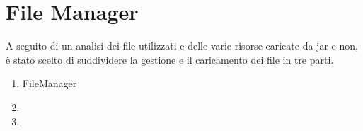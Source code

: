 \section{File Manager}
\label{sec:file_manager_design}
A seguito di un analisi dei file utilizzati e delle varie risorse caricate da jar e non, è stato scelto di suddividere la gestione e il caricamento dei file in tre parti.

\begin{enumerate}
    \item FileManager
    \item
    \item
\end{enumerate}
